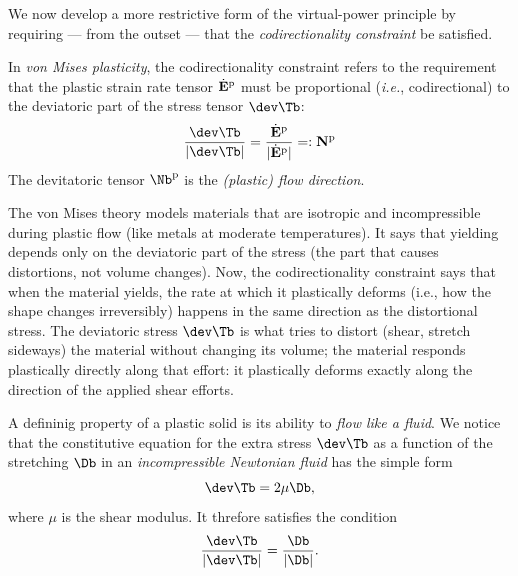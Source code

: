 We now develop a more restrictive form of the virtual-power principle by requiring — from the outset — that the \textit{codirectionality constraint}%
be satisfied.

In \textit{von Mises plasticity}, the codirectionality constraint refers to the requirement that the plastic strain rate tensor $\dot{\mathbf{E}}^{\rm p}$ must be proportional (\textit{i.e.}, codirectional) to the deviatoric part of the stress tensor $\dev \Tb$:
\begin{equation}
\label{codir}
\frac{\dev \Tb}{|\dev \Tb|} =\frac{\dot{\mathbf{E}}^{\rm p}}{|\dot{\mathbf{E}}^{\rm p}|}= :\mathbf{N}^{\rm p}
\end{equation}
The devitatoric tensor $\Nb^{\rm p}$ is the \textit{(plastic) flow direction}.

The von Mises theory models materials that are isotropic and incompressible during plastic flow (like metals at moderate temperatures). It says that yielding depends only on the deviatoric part of the stress (the part that causes distortions, not volume changes). Now, the codirectionality constraint says that when the material yields, the rate at which it plastically deforms (i.e., how the shape changes irreversibly) happens in the same direction as the distortional stress. The deviatoric stress $\dev \Tb$ is what tries to distort (shear, stretch sideways) the material without changing its volume; the material responds plastically directly along that effort: it plastically deforms exactly along the direction of the applied shear efforts.

\begin{remark}
A defininig property of a plastic solid is its ability to \textit{flow like a fluid}. We notice that the constitutive equation for the extra stress $\dev \Tb$ as a function of the stretching $\Db$ in an \textit{incompressible Newtonian fluid} has the simple form
\begin{equation}
	\dev \Tb=2\mu \Db,
\end{equation}
where $\mu$ is the shear modulus. It threfore satisfies the condition
\begin{equation}
\frac{\dev \Tb}{|\dev \Tb|}=\frac{\Db}{|\Db|}.
\end{equation}
\end{remark}


